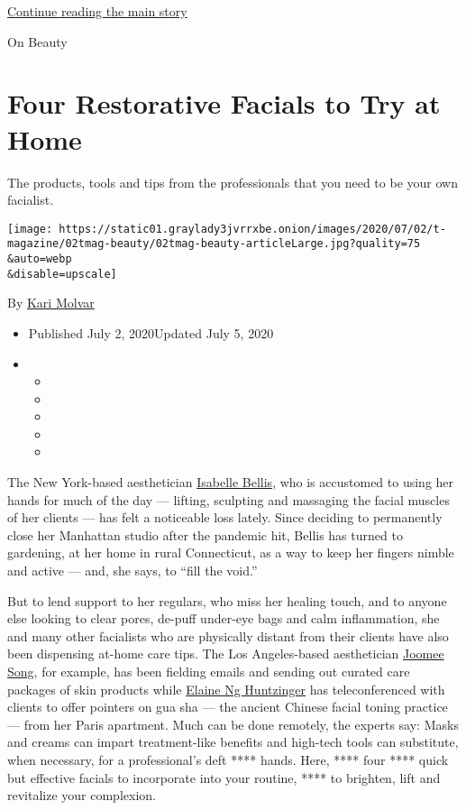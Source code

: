 \protect\hyperlink{after-sponsor}{Continue reading the main story}

On Beauty

\hypertarget{four-restorative-facials-to-try-at-home}{%
\section{Four Restorative Facials to Try at
Home}\label{four-restorative-facials-to-try-at-home}}

The products, tools and tips from the professionals that you need to be
your own facialist.

\texttt{[image: https://static01.graylady3jvrrxbe.onion/images/2020/07/02/t-magazine/02tmag-beauty/02tmag-beauty-articleLarge.jpg?quality=75\\\&auto=webp\\\&disable=upscale]}

By \href{https://www.nytimes3xbfgragh.onion/by/kari-molvar}{Kari Molvar}

\begin{itemize}
\item
  Published July 2, 2020Updated July 5, 2020
\item
  \begin{itemize}
  \item
  \item
  \item
  \item
  \item
  \end{itemize}
\end{itemize}

The New York-based aesthetician
\href{https://isabellebellis.com/}{Isabelle Bellis}, who is accustomed
to using her hands for much of the day --- lifting, sculpting and
massaging the facial muscles of her clients --- has felt a noticeable
loss lately. Since deciding to permanently close her Manhattan studio
after the pandemic hit, Bellis has turned to gardening, at her home in
rural Connecticut, as a way to keep her fingers nimble and active ---
and, she says, to ``fill the void.''

But to lend support to her regulars, who miss her healing touch, and to
anyone else looking to clear pores, de-puff under-eye bags and calm
inflammation, she and many other facialists who are physically distant
from their clients have also been dispensing at-home care tips. The Los
Angeles-based aesthetician \href{https://faceworksinc.com/}{Joomee
Song}, for example, has been fielding emails and sending out curated
care packages of skin products while
\href{https://linktr.ee/elainehuntzinger}{Elaine Ng Huntzinger} has
teleconferenced with clients to offer pointers on gua sha --- the
ancient Chinese facial toning practice --- from her Paris apartment.
Much can be done remotely, the experts say: Masks and creams can impart
treatment-like benefits and high-tech tools can substitute, when
necessary, for a professional's deft **** hands. Here, **** four ****
quick but effective facials to incorporate into your routine, **** to
brighten, lift and revitalize your complexion.

